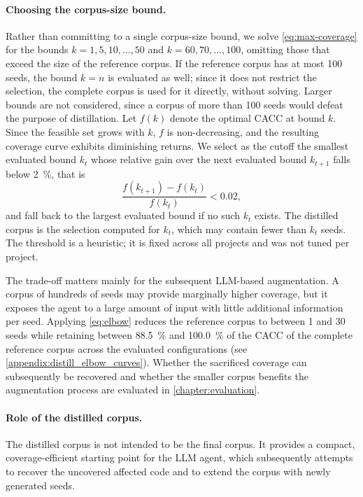 \paragraph{Choosing the corpus-size bound.}
Rather than committing to a single corpus-size bound, we solve \eqref{eq:max-coverage} for the bounds $k=1,5,10,\ldots,50$ and $k=60,70,\ldots,100$, omitting those that exceed the size of the reference corpus.
If the reference corpus has at most \num{100} seeds, the bound $k=n$ is evaluated as well; since it does not restrict the selection, the complete corpus is used for it directly, without solving.
Larger bounds are not considered, since a corpus of more than \num{100} seeds would defeat the purpose of distillation.
Let $f(k)$ denote the optimal \ac{CACC} at bound $k$.
Since the feasible set grows with $k$, $f$ is non-decreasing, and the resulting coverage curve exhibits diminishing returns.
We select as the cutoff the smallest evaluated bound $k_t$ whose relative gain over the next evaluated bound $k_{t+1}$ falls below \SI{2}{\percent}, that is
\begin{equation}
  \frac{f(k_{t+1})-f(k_t)}{f(k_t)} < 0.02 ,
  \label{eq:elbow}
\end{equation}
and fall back to the largest evaluated bound if no such $k_t$ exists.
The distilled corpus is the selection computed for $k_t$, which may contain fewer than $k_t$ seeds.
The threshold is a heuristic; it is fixed across all projects and was not tuned per project.

The trade-off matters mainly for the subsequent \ac{LLM}-based augmentation.
A corpus of hundreds of seeds may provide marginally higher coverage, but it exposes the agent to a large amount of input with little additional information per seed.
Applying \eqref{eq:elbow} reduces the reference corpus to between \num{1} and \num{30} seeds while retaining between \SI{88.5}{\percent} and \SI{100.0}{\percent} of the \ac{CACC} of the complete reference corpus across the evaluated configurations (see \cref{appendix:distill_elbow_curves}).
Whether the sacrificed coverage can subsequently be recovered and whether the smaller corpus benefits the augmentation process are evaluated in \cref{chapter:evaluation}.

\paragraph{Role of the distilled corpus.}
The distilled corpus is not intended to be the final corpus.
It provides a compact, coverage-efficient starting point for the \ac{LLM} agent, which subsequently attempts to recover the uncovered affected code and to extend the corpus with newly generated seeds.

